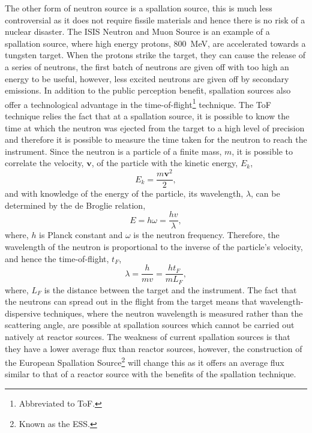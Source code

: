 The other form of neutron source is a spallation source, this is much less controversial as it does not require fissile materials and hence there is no risk of a nuclear disaster.
The ISIS Neutron and Muon Source is an example of a spallation source, where high energy protons, \SI{800}{\mega\eV},\autocite{noauthor_isis_nodate-1} are accelerated towards a tungsten target.
When the protons strike the target, they can cause the release of a series of neutrons, the first batch of neutrons are given off with too high an energy to be useful, however, less excited neutrons are given off by secondary emissions.
In addition to the public perception benefit, spallation sources also offer a technological advantage in the time-of-flight\footnote{Abbreviated to ToF.} technique.
The ToF technique relies the fact that at a spallation source, it is possible to know the time at which the neutron was ejected from the target to a high level of precision and therefore it is possible to measure the time taken for the neutron to reach the instrument.
Since the neutron is a particle of a finite mass, $m$, it is possible to correlate the velocity, $\mathbf{v}$, of the particle with the kinetic energy, $E_k$,
%
\begin{equation}
    E_k = \frac{m\mathbf{v}^2}{2},
\end{equation}
%
and with knowledge of the energy of the particle, its wavelength, $\lambda$, can be determined by the de Broglie relation,\autocite{de_broglie_recherches_1925}
%
\begin{equation}
    E = h\omega = \frac{hv}{\lambda},
\end{equation}
%
where, $h$ is Planck constant and $\omega$ is the neutron frequency.
Therefore, the wavelength of the neutron is proportional to the inverse of the particle's velocity, and hence the time-of-flight, $t_F$,
%
\begin{equation}
    \lambda = \frac{h}{mv} = \frac{ht_F}{mL_F},
\end{equation}
%
where, $L_F$ is the distance between the target and the instrument.
The fact that the neutrons can spread out in the flight from the target means that wavelength-dispersive techniques, where the neutron wavelength is measured rather than the scattering angle, are possible at spallation sources which cannot be carried out natively at reactor sources.
The weakness of current spallation sources is that they have a lower average flux than reactor sources, however, the construction of the European Spallation Source\footnote{Known as the ESS.} will change this as it offers an average flux similar to that of a reactor source with the benefits of the spallation technique.

